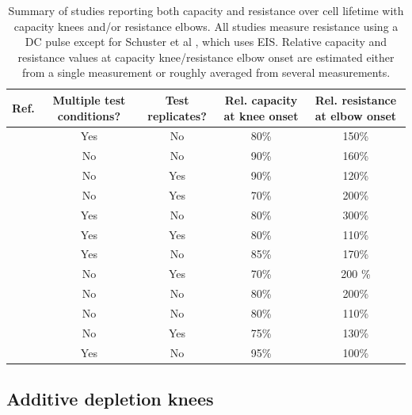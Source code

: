 \documentclass[journal=jpcl, manuscript=article, layout=onecolumn]{achemso}
\begin{document}
\begin{table}[!ht]
    \centering
    \begin{tabular}{||c||c|c|c|c||}
        \hline
        Ref. & Multiple test conditions? & Test replicates? & Rel. capacity at knee onset & Rel. resistance at elbow onset \\
        \hline
        \cite{ecker_calendar_2014} & Yes & No & 80\% & 150\% \\
        \cite{rahe_nanoscale_2019} & No & No & 90\% & 160\% \\
        \cite{willenberg_development_2020} & No & Yes & 90\% & 120\% \\
        \cite{broussely_main_2005} & No & Yes & 70\% & 200\% \\
        \cite{schuster_nonlinear_2015} & Yes & No & 80\% & 300\% \\
        \cite{lewerenz_systematic_2017, lewerenz_post-mortem_2017} & Yes & Yes & 80\% & 110\% \\
        \cite{martinez-laserna_technical_2018} & Yes & No &  85\% & 170\% \\
        \cite{braco_experimental_2020} & No & Yes & 70\% & 200 \% \\
        \cite{frisco_understanding_2016} & No & No & 80\% & 200\% \\
        \cite{klett_non-uniform_2014} & No & No & 80\% & 110\% \\
        \cite{pfrang_long-term_2018} & No & Yes & 75\% & 130\% \\
        \cite{wunsch_investigation_2019} & Yes & No & 95\% & 100\% \\
        \hline
    \end{tabular}
    \caption{Summary of studies reporting both capacity and resistance over cell lifetime with capacity knees and/or resistance elbows. All studies measure resistance using a DC pulse except for Schuster et al \cite{schuster_nonlinear_2015}, which uses EIS. Relative capacity and resistance values at capacity knee/resistance elbow onset are estimated either from a single measurement or roughly averaged from several measurements.}
    \label{tab:dcr_growth_papers}
\end{table}



\subsection{Additive depletion knees}
\end{document}
